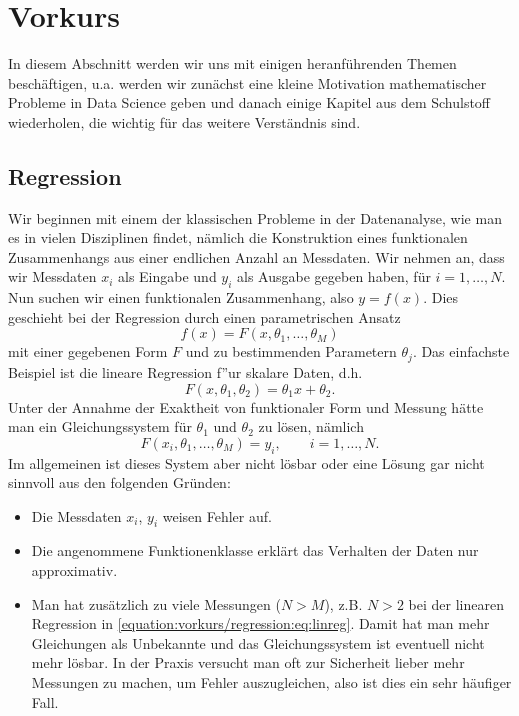 \chapter{Vorkurs}
\label{\detokenize{vorkurs/vorkurs:vorkurs}}\label{\detokenize{vorkurs/vorkurs::doc}}
In diesem Abschnitt werden wir uns mit einigen heranführenden Themen beschäftigen, u.a. werden wir zunächst eine kleine Motivation mathematischer Probleme in Data Science geben und danach einige Kapitel aus dem Schulstoff wiederholen, die wichtig für das weitere Verständnis sind.


\section{Regression}
\label{\detokenize{vorkurs/regression:regression}}\label{\detokenize{vorkurs/regression::doc}}
Wir beginnen mit einem der klassischen Probleme in der Datenanalyse, wie man es in vielen Disziplinen findet, nämlich die Konstruktion eines funktionalen Zusammenhangs aus einer endlichen Anzahl an Messdaten. Wir nehmen an, dass
wir Messdaten \(x_i\) als Eingabe und \(y_i\) als Ausgabe gegeben haben, für \(i=1,\ldots, N\). Nun suchen wir einen funktionalen Zusammenhang, also \(y=f(x)\). Dies geschieht bei der Regression durch einen parametrischen Ansatz
\begin{equation*}
 f(x) = F(x,\theta_1,\ldots,\theta_M)\end{equation*}
mit einer gegebenen Form \(F\) und   zu bestimmenden Parametern \(\theta_j\). Das einfachste Beispiel ist die lineare Regression f”ur skalare Daten, d.h.
\begin{equation}\label{equation:vorkurs/regression:eq:linreg}
F(x,\theta_1,\theta_2) = \theta_1 x + \theta_2 .
\end{equation}
Unter der Annahme der Exaktheit von funktionaler Form und Messung hätte man ein Gleichungssystem für \(\theta_1\) und \(\theta_2\) zu lösen, nämlich
\begin{equation}\label{equation:vorkurs/regression:eq:nonlinreg}
 F(x_i,\theta_1,\ldots,\theta_M) = y_i, \qquad i=1,\ldots,N. 
\end{equation}
Im allgemeinen ist dieses System aber nicht lösbar oder eine Lösung gar nicht sinnvoll aus den folgenden Gründen:
\begin{itemize}
\item {} 
Die Messdaten \(x_i\), \(y_i\) weisen Fehler auf.

\item {} 
Die angenommene Funktionenklasse erklärt das Verhalten der Daten nur approximativ.

\item {} 
Man hat zusätzlich zu viele Messungen (\(N > M\)), z.B. \(N > 2\) bei der linearen Regression in \eqref{equation:vorkurs/regression:eq:linreg}. Damit hat man mehr Gleichungen als Unbekannte und das Gleichungssystem ist eventuell nicht mehr lösbar. In der Praxis versucht man oft zur Sicherheit lieber mehr Messungen zu machen, um Fehler auszugleichen, also ist dies ein sehr häufiger Fall.

\end{itemize}


